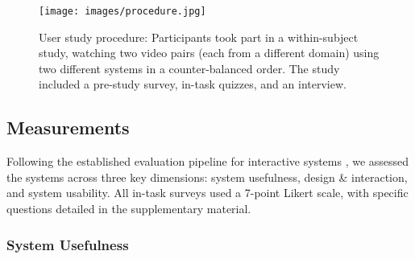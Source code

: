 \begin{figure*}[h]
  \centering
  \texttt{[image: images/procedure.jpg]}
  \caption{User study procedure: Participants took part in a within-subject study, watching two video pairs (each from a different domain) using two different systems in a counter-balanced order. The study included a pre-study survey, in-task quizzes, and an interview.}\label{fig:study-procedure}
\end{figure*}






\subsection{Measurements}
Following the established evaluation pipeline for interactive systems \cite{weibelzahl2020evaluation, xia2022persua}, we assessed the systems across three key dimensions: system usefulness, design \& interaction, and system usability. All in-task surveys used a 7-point Likert scale, with specific questions detailed in the supplementary material.

\subsubsection*{System Usefulness}

